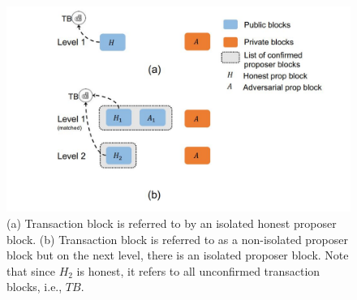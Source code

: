 \begin{center}
    \begin{figure}
        \centering
        \includegraphics[width=0.8\linewidth]{Fig/09/F5}
        \caption{(a) Transaction block is referred to by an isolated honest proposer block. (b) Transaction block is referred to as a non-isolated proposer block but on the next level, there is an isolated proposer block. Note that since $H_{2}$ is honest, it refers to all unconfirmed transaction blocks, i.e., $TB$.}
        \label{fig:f5}
    \end{figure}
\end{center}
